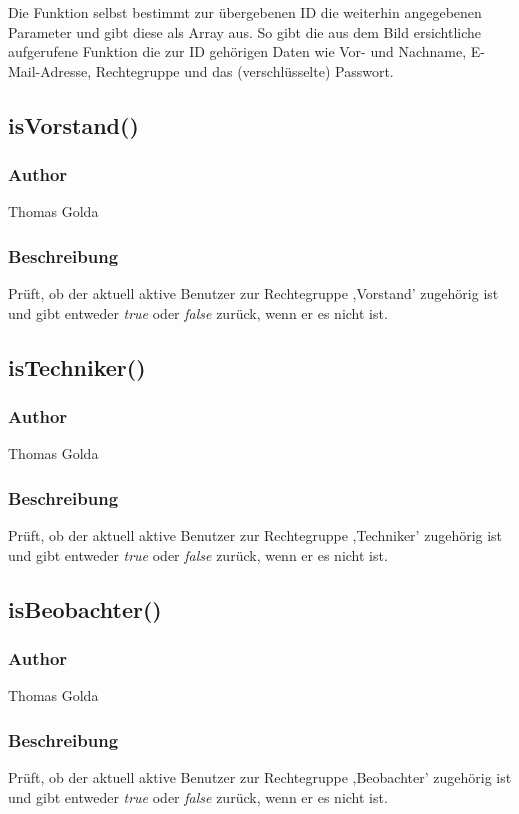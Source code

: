 \documentclass[fontsize = 12pt, paper = a4]{scrreprt}
\begin{document}
Die Funktion selbst bestimmt zur übergebenen ID die weiterhin angegebenen Parameter und gibt diese als Array aus. So gibt die aus dem Bild ersichtliche aufgerufene Funktion die zur ID gehörigen Daten wie Vor- und Nachname, E-Mail-Adresse, Rechtegruppe und das (verschlüsselte) Passwort.


\subsection*{isVorstand()}
\subsubsection*{Author}
Thomas Golda
\subsubsection*{Beschreibung}
Prüft, ob der aktuell aktive Benutzer zur Rechtegruppe ,Vorstand' zugehörig ist und gibt entweder \textit{true} oder \textit{false} zurück, wenn er es nicht ist.


\subsection*{isTechniker()}
\subsubsection*{Author}
Thomas Golda
\subsubsection*{Beschreibung}
Prüft, ob der aktuell aktive Benutzer zur Rechtegruppe ,Techniker' zugehörig ist und gibt entweder \textit{true} oder \textit{false} zurück, wenn er es nicht ist.


\subsection*{isBeobachter()}
\subsubsection*{Author}
Thomas Golda
\subsubsection*{Beschreibung}
Prüft, ob der aktuell aktive Benutzer zur Rechtegruppe ,Beobachter' zugehörig ist und gibt entweder \textit{true} oder \textit{false} zurück, wenn er es nicht ist.
\end{document}
